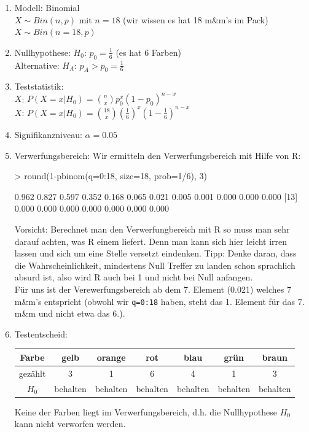\begin{enumerate}
	\item Modell: Binomial\\
	$X \sim Bin(n,p)$ mit $n=18$ (wir wissen es hat 18 m\&m's im Pack)\\
	$X \sim Bin(n=18, p)$
	\item Nullhypothese: $H_0$: $p_0 = \frac{1}{6}$ (es hat 6 Farben) \\
	Alternative: $H_A$: $p_A > p_0 = \frac{1}{6}$ 
	\item Teststatistik: \\
	$X$: $P(X=x|H_0)={n \choose x} p_0^x (1-p_0)^{n-x}$ \\
	$X$: $P(X=x|H_0)={18 \choose x} (\frac{1}{6})^x (1-\frac{1}{6})^{n-x}$
	\item Signifikanzniveau: $\alpha=0.05$
	\item Verwerfungsbereich:
	Wir ermitteln den Verwerfungsbereich mit Hilfe von R:
\begin{Schunk}
\begin{Sinput}
> round(1-pbinom(q=0:18, size=18, prob=1/6), 3)
\end{Sinput}
\begin{Soutput}
 [1] 0.962 0.827 0.597 0.352 0.168 0.065 0.021 0.005 0.001 0.000 0.000 0.000
[13] 0.000 0.000 0.000 0.000 0.000 0.000 0.000
\end{Soutput}
\end{Schunk}
	Vorsicht: Berechnet man den Verwerfungbereich mit R so muss man sehr
	darauf achten, was R einem liefert. Denn man kann sich hier leicht 
	irren lassen und sich um eine Stelle versetzt eindenken. Tipp: Denke
	daran, dass die Wahrscheinlichkeit, mindestens Null Treffer zu landen
	schon sprachlich absurd ist, also wird R auch bei 1 und nicht bei Null
	anfangen.\\
	Für uns ist der Verewerfungsbereich ab dem 7. Element (0.021) welches
	7 m\&m's entspricht (obwohl wir \verb!q=0:18! haben, steht das 1. Element
	für das 7. m\&m und nicht etwa das 6.).
	\item Testentscheid:\\
	
	\begin{table}[h!]
	\centering
	\begin{tabular}{c|c|c|c|c|c|c}
	Farbe & gelb & orange & rot & blau & grün & braun \\
	\hline
	gezählt & 3 & 1 & 6 & 4 & 1 & 3 \\
	\hline
	$H_0$ & behalten & behalten & behalten & behalten & behalten & behalten \\ 
	\end{tabular}
	\end{table}

	\noindent
	Keine der Farben liegt im Verwerfungsbereich, d.h. die Nullhypothese
	$H_0$ kann nicht verworfen werden.
\end{enumerate}


